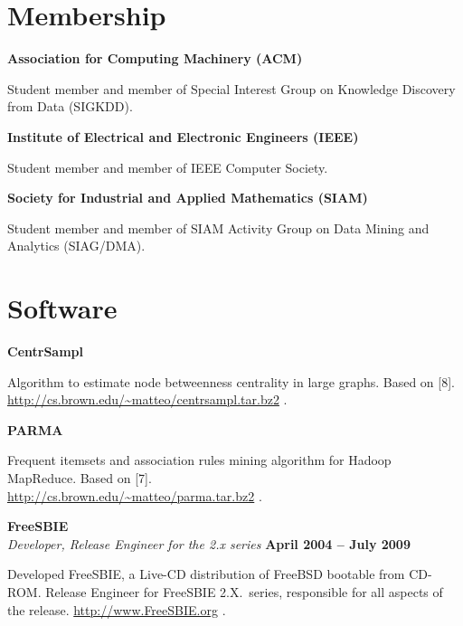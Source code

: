\documentclass[margin,line]{resume}
\begin{document}
\section{\sc Membership}
{\bf Association for Computing Machinery (ACM)}
\begin{list2}
\vspace*{.05in}
\item Student member and member of Special Interest Group on Knowledge Discovery
  from Data (SIGKDD).
\end{list2}
{\bf Institute of Electrical and Electronic Engineers (IEEE)}
\begin{list2}
\vspace*{.05in}
\item Student member and member of IEEE Computer Society.
\end{list2}
{\bf Society for Industrial and Applied Mathematics (SIAM)}
\begin{list2}
\vspace*{.05in}
\item Student member and member of SIAM Activity Group on Data Mining and Analytics
  (SIAG/DMA).
\end{list2}

\section{\sc Software}

{\bf CentrSampl}
\begin{list2}
  \vspace*{.05in}
\item Algorithm to estimate node betweenness centrality in large graphs. Based
  on [8]. \\\url{http://cs.brown.edu/~matteo/centrsampl.tar.bz2} .
\end{list2}

{\bf PARMA} 
\begin{list2}
  \vspace*{.05in}
\item Frequent itemsets and association rules mining algorithm for Hadoop MapReduce.
  Based on [7]. \\\url{http://cs.brown.edu/~matteo/parma.tar.bz2} .
\end{list2}

{\bf FreeSBIE }\\
{\em Developer, Release Engineer for the 2.x series} \hfill{\bf April 2004 --
July 2009}

\begin{list2}
\vspace*{.05in}
\item Developed FreeSBIE, a Live-CD distribution of FreeBSD bootable from CD-ROM.
Release Engineer for FreeSBIE 2.X.~series, responsible for all aspects of
the release. \url{http://www.FreeSBIE.org} .
\end{list2}
\end{document}
